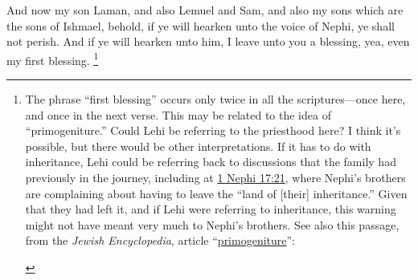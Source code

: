 			And now my son Laman, and also Lemuel and Sam,
			and also my sons which are the sons of Ishmael,
			behold, if ye will hearken unto the voice of Nephi,
			ye shall not perish.
			And if ye will hearken unto him,
			I leave unto you a blessing, yea, even my first blessing.%
				\footnote{%
					\label{2NEPHI-1-28-first}%
					The phrase ``first blessing'' occurs only twice in all the scriptures---once here, and once in the next verse. This may be related to the idea of ``primogeniture.'' Could Lehi be referring to the priesthood here? I think it's possible, but there would be other interpretations. If it has to do with inheritance, Lehi could be referring back to discussions that the family had previously in the journey, including at \hyperref[1NEPHI-17-21]{1 Nephi 17:21}, where Nephi's brothers are complaining about having to leave the ``land of [their] inheritance.'' Given that they had left it, and if Lehi were referring to inheritance, this warning might not have meant very much to Nephi's brothers. See also this passage, from the \textit{Jewish Encyclopedia}, article ``\href{https://www.jewishencyclopedia.com/articles/12362-primogeniture}{primogeniture}'':
						\begin{quote}

\end{quote}}
